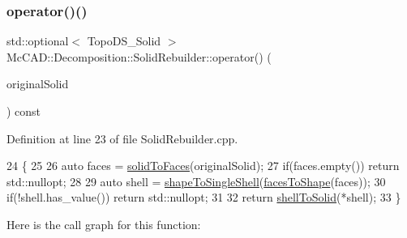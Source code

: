 \mbox{\label{classMcCAD_1_1Decomposition_1_1SolidRebuilder_acd4a860cd5e7e2fa349ae891da81556a}} 
\subsubsection{\texorpdfstring{operator()()}{operator()()}\hspace{0.1cm}{\footnotesize\ttfamily [1/2]}}
{\footnotesize\ttfamily std\+::optional$<$ Topo\+D\+S\+\_\+\+Solid $>$ Mc\+C\+A\+D\+::\+Decomposition\+::\+Solid\+Rebuilder\+::operator() (\begin{DoxyParamCaption}\item[{const Topo\+D\+S\+\_\+\+Solid \&}]{original\+Solid }\end{DoxyParamCaption}) const}



Definition at line 23 of file Solid\+Rebuilder.\+cpp.


\begin{DoxyCode}
24                                                 \{
25 
26     \textcolor{keyword}{auto} faces = \hyperlink{classMcCAD_1_1Decomposition_1_1SolidRebuilder_a865c311ae7c34395b9c7911c88af56cb}{solidToFaces}(originalSolid);
27     \textcolor{keywordflow}{if}(faces.empty()) \textcolor{keywordflow}{return} std::nullopt;
28 
29     \textcolor{keyword}{auto} shell = \hyperlink{classMcCAD_1_1Decomposition_1_1SolidRebuilder_abcbb84bed6ab279e3f5ed3342d439f22}{shapeToSingleShell}(\hyperlink{classMcCAD_1_1Decomposition_1_1SolidRebuilder_a999dae53070de2c6681c51cfc6a56cd5}{facesToShape}(faces));
30     \textcolor{keywordflow}{if}(!shell.has\_value()) \textcolor{keywordflow}{return} std::nullopt;
31 
32     \textcolor{keywordflow}{return} \hyperlink{classMcCAD_1_1Decomposition_1_1SolidRebuilder_af37e601d9e3fa7309e7a02f95d8faa61}{shellToSolid}(*shell);
33 \}
\end{DoxyCode}
Here is the call graph for this function\+:
\mbox{\label{classMcCAD_1_1Decomposition_1_1SolidRebuilder_acf06e8ef7a0849111550f4ca05ff44da}} 
